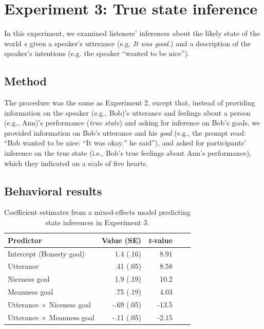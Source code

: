 \documentclass[10pt,letterpaper]{article}
\begin{document}
\section{Experiment 3: True state inference}

In this experiment, we examined listeners' inferences about the likely state of the world $s$ given a speaker's utterance (e.g. \emph{It was good.}) and a description of the speaker's intentions (e.g. the speaker ``wanted to be nice'').

\subsection{Method}

The procedure was the same as Experiment 2, except that, instead of providing information on the speaker (e.g., Bob)'s utterance and feelings about a person (e.g., Ann)'s performance (\emph{true state}) and asking for inference on Bob's goals, we provided information on Bob's utterance and his \emph{goal} (e.g., the prompt read: ``Bob wanted to be nice: ``It was okay,'' he said''), and asked for participants' inference on the true state (i.e., Bob's true feelings about Ann's performance), which they indicated on a scale of five hearts.

\subsection{Behavioral results}

\begin{table}[t]
\caption{\label{tab:lmer2}  Coefficient estimates from a mixed-effects model predicting state inferences in Experiment 3.} 
\begin{center} 
\begin{tabular}{l r r r l} 
\hline
Predictor  &  Value (SE) & \emph{t}-value\\
\hline
Intercept (Honesty goal)  & 1.4 (.16) & 8.91 \\
Utterance & .41 (.05) &  8.58 \\
Niceness goal  & 1.9 (.19) & 10.2 \\
Meanness goal & .75 (.19) & 4.03 \\
Utterance $\times$ Niceness goal & -.69 (.05) & -13.5 \\
Utterance $\times$ Meanness goal & -.11 (.05) & -2.15 \\
\hline
\end{tabular} 
\end{center} 
\end{table}
\end{document}

